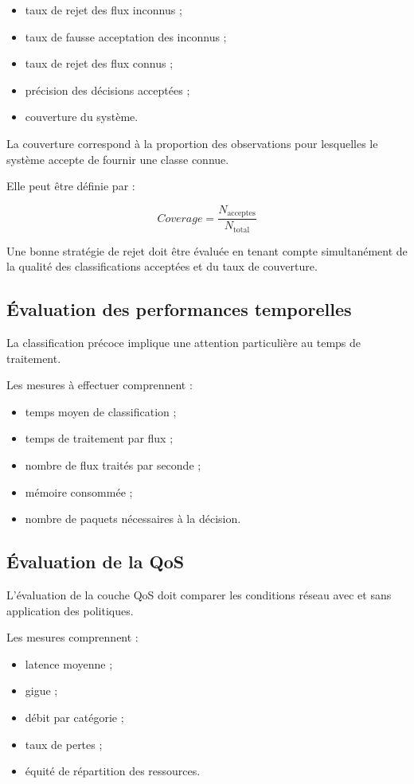 \begin{itemize}
    \item taux de rejet des flux inconnus ;
    \item taux de fausse acceptation des inconnus ;
    \item taux de rejet des flux connus ;
    \item précision des décisions acceptées ;
    \item couverture du système.
\end{itemize}

La couverture correspond à la proportion des observations
pour lesquelles le système accepte de fournir
une classe connue.

Elle peut être définie par :

\[
Coverage=
\frac{N_{\text{acceptes}}}
{N_{\text{total}}}
\]

Une bonne stratégie de rejet doit être évaluée
en tenant compte simultanément de la qualité
des classifications acceptées et du taux de couverture.

\subsection{Évaluation des performances temporelles}

La classification précoce implique une attention
particulière au temps de traitement.

Les mesures à effectuer comprennent :

\begin{itemize}
    \item temps moyen de classification ;
    \item temps de traitement par flux ;
    \item nombre de flux traités par seconde ;
    \item mémoire consommée ;
    \item nombre de paquets nécessaires à la décision.
\end{itemize}

\subsection{Évaluation de la QoS}

L'évaluation de la couche QoS doit comparer les
conditions réseau avec et sans application des
politiques.

Les mesures comprennent :

\begin{itemize}
    \item latence moyenne ;
    \item gigue ;
    \item débit par catégorie ;
    \item taux de pertes ;
    \item équité de répartition des ressources.
\end{itemize}

